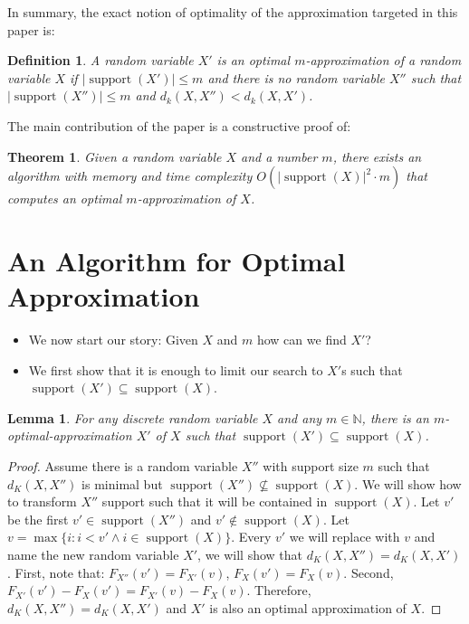 \documentclass{article}
\newtheorem{lemma}[thm]{Lemma}
\newtheorem{definition}[thm]{Definition}
\newtheorem{theorem}[thm]{Theorem}
\DeclareMathOperator{\support}{support}
\begin{document}
In summary, the exact notion of optimality of the approximation targeted in this paper is:
\begin{definition}
	A random variable $X'$ is an optimal $m$-approximation of a random variable $X$ if $|\support(X')| \leq m$ and there is no random variable $X''$ such that $|\support(X'')| \leq m$ and $d_k(X,X'') < d_k(X,X')$.
\end{definition}

The main contribution of the paper is a constructive proof of:
\begin{theorem}
	Given a random variable $X$ and a number $m$, there exists an algorithm with memory and time complexity $O(|\support(X)|^2 \cdot m)$  that computes an optimal $m$-approximation of $X$.
\end{theorem}


\section{An Algorithm for Optimal Approximation}


\begin{itemize}
	\item We now start our story: Given $X$ and $m$ how can we find $X'$?
	\item We first show that it is enough to limit our search to $X'$s such that $\support(X') \subseteq \support(X)$.
\end{itemize}

\begin{lemma}
	For any discrete random variable $X$ and any $m \in \mathbb{N}$, there is an $m$-optimal-approximation $X'$ of $X$ such that $\support(X') \subseteq \support(X)$.
\end{lemma}
\begin{proof}
Assume there is a random variable $X''$ with support size $m$ such that $d_K(X,X'')$ is minimal but $\support(X'')\nsubseteq\support(X)$.
We will show how to transform $X''$ support such that it will be contained in $\support(X)$. Let $v'$ be the first $v'\in\support(X'')$ and $v' \not\in\support(X)$. Let $v=\max\{i: i<v' \wedge i\in\support(X)\}$. Every $v'$ we will replace with $v$ and name the new random variable $X'$, we will show that $d_K(X,X'') = d_K(X,X')$. First, note that:
$F_{X''}(v')=F_{X'}(v)$, $F_{X}(v')=F_{X}(v)$.
Second,  $F_{X'}(v')-F_{X}(v') = F_{X'}(v)-F_{X}(v)$. Therefore, $d_K(X,X'') = d_K(X,X')$ and $X'$ is also an optimal approximation of $X$.
\end{proof}
\end{document}
